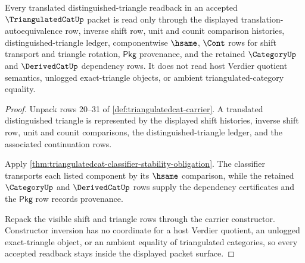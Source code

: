 \begin{theorem}
\label{thm:triangulatedcat-translation-triangle-obligation-scope}
Every translated distinguished-triangle readback in an accepted
$\TriangulatedCatUp$ packet is read only through the displayed
translation-autoequivalence row, inverse shift row, unit and counit comparison
histories, distinguished-triangle ledger, componentwise $\hsame$, $\Cont$ rows
for shift transport and triangle rotation, $\mathsf{Pkg}$ provenance, and the
retained $\CategoryUp$ and $\DerivedCatUp$ dependency rows. It does not read
host Verdier quotient semantics, unlogged exact-triangle objects, or ambient
triangulated-category equality.
\end{theorem}
\begin{proof}
Unpack rows 20--31 of \autoref{def:triangulatedcat-carrier}. A translated
distinguished triangle is represented by the displayed shift histories, inverse
shift row, unit and counit comparisons, the distinguished-triangle ledger, and
the associated continuation rows.

Apply \autoref{thm:triangulatedcat-classifier-stability-obligation}. The
classifier transports each listed component by its $\hsame$ comparison, while
the retained $\CategoryUp$ and $\DerivedCatUp$ rows supply the dependency
certificates and the $\mathsf{Pkg}$ row records provenance.

Repack the visible shift and triangle rows through the carrier constructor.
Constructor inversion has no coordinate for a host Verdier quotient, an
unlogged exact-triangle object, or an ambient equality of triangulated
categories, so every accepted readback stays inside the displayed packet
surface.
\end{proof}

